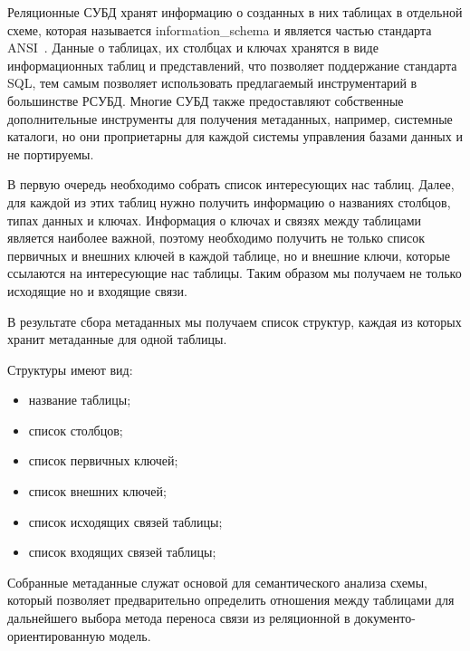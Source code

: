 Реляционные СУБД хранят информацию о созданных в них таблицах в отдельной схеме, 
которая называется information\_schema и является частью стандарта ANSI~\cite{sql-92}.
Данные о таблицах, их столбцах и ключах хранятся в виде информационных таблиц и представлений, 
что позволяет поддержание стандарта SQL, тем самым позволяет использовать предлагаемый инструментарий в большинстве РСУБД.
Многие СУБД также предоставляют собственные дополнительные инструменты для получения метаданных, например, системные каталоги,
но они проприетарны для каждой системы управления базами данных и не портируемы.

В первую очередь необходимо собрать список интересующих нас таблиц.
Далее, для каждой из этих таблиц нужно получить информацию о названиях столбцов, типах данных и ключах.
Информация о ключах и связях между таблицами является наиболее важной, 
поэтому необходимо получить не только список первичных и внешних ключей в каждой таблице, но и внешние ключи, 
которые ссылаются на интересующие нас таблицы.
Таким образом мы получаем не только исходящие но и входящие связи.

В результате сбора метаданных мы получаем список структур, каждая из которых хранит метаданные для одной таблицы.

\noindent Структуры имеют вид:
\begin{itemize}[label=---]
    \item название таблицы;
    \item список столбцов; 

    \item список первичных ключей;
    \item список внешних ключей;
    \item список исходящих связей таблицы;
    \item список входящих связей таблицы;
\end{itemize}

Собранные метаданные служат основой для семантического анализа схемы, 
который позволяет предварительно определить отношения между таблицами для 
дальнейшего выбора метода переноса связи из реляционной в документо-ориентированную модель.

